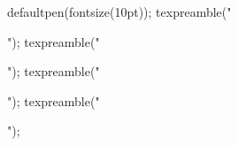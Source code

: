 \begin{asydef}
defaultpen(fontsize(10pt));
texpreamble("\usepackage[noopticals,onlytext]{MinionPro}");
texpreamble("\usepackage[small]{eulervm}");
texpreamble("\usepackage{nicefrac}");
texpreamble("\usepackage{cool}");
\end{asydef}

\makeatletter
\newcommand{\COOL@notation@ExpBaseESymb}{exp}%
\newcommand{\COOL@notation@ExpShowBase}{at will}%
\renewcommand{\Exp}[2][\E]
{%
\ifthenelse{ \equal{\COOL@notation@ExpShowBase}{at will} }%
{%
\ifthenelse{ \equal{#1}{\E} }%
{%
\ifthenelse{ \equal{\COOL@notation@ExpBaseESymb}{exp} }%
{%
\exp \COOL@decide@paren{Exp}{#2}%
}%
{%
\ifthenelse{ \equal{\COOL@notation@ExpBaseESymb}{exp} }%
{%
\exp \COOL@decide@paren{Exp}{#2}%
}%
{%
\PackageError{cool}{Invalid Option Sent}%
{ExpBaseESymb can only be `ln' or `log'}%
}%
}%
}%
{%
\ifthenelse{ \equal{#1}{10} \AND
\NOT \equal{\COOL@notation@ExpBaseESymb}{exp}  }%
{%
\exp \COOL@decide@paren{Exp}{#2}%
}%
{%
\exp_{#1} \COOL@decide@paren{Exp}{#2}%
}%
}%
}%
{%
\ifthenelse{ \equal{\COOL@notation@ExpShowBase}{always} }%
{%
\exp_{#1}\COOL@decide@paren{Exp}{#2}%
}%
{%
\PackageError{cool}{Invalid Option Sent}%
{LogShowBase can only be 'at will' or 'always'}%
}%
}%
}

\makeatother

\usepackage{esdiff}

\newcommand{\df}{}

\makeatletter
\def\df{\@ifnextchar[{\ES@diffform@i}{\ES@diffform@ii}}
\def\ES@diffform@i[#1]#2{\mathchoice{%
\ES@dop\ES@difint#2^{#1}}%
{\ES@taille{\ES@dop\ES@difint#2^{#1}}}%
{\scriptstyle{\ES@dop\ES@difint#2^{#1}}}%
{\scriptstyle{\ES@dop\ES@difint#2^{#1}}}}

\def\ES@diffform@ii#1{\mathchoice%
{\ES@dop\ES@difint#1}%
{\ES@taille{\ES@dop\ES@difint#1}}%
{\scriptstyle{\ES@dop\ES@difint#1}}%
{\scriptstyle{\ES@dop\ES@difint#1}}}

\makeatother
